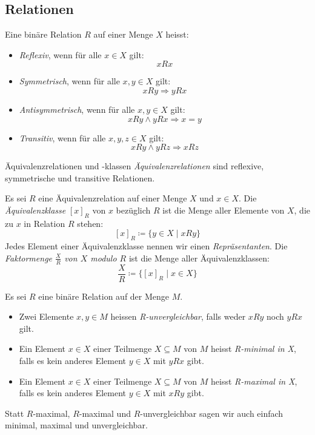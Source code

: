 \subsection{Relationen}\label{subsec:relationen}

\begin{definition}{}
    Eine binäre Relation $R$ auf einer Menge $X$ heisst:
    \begin{itemize}
        \item \emph{Reflexiv}, wenn für alle $x \in X$ gilt: \[xRx\]
        \item \emph{Symmetrisch}, wenn für alle $x,y \in X$ gilt: \[xRy \Rightarrow yRx\]
        \item \emph{Antisymmetrisch}, wenn für alle $x,y \in X$ gilt: \[xRy \land yRx \Rightarrow x = y\]
        \item \emph{Transitiv}, wenn für alle $x,y,z \in X$ gilt: \[xRy \land yRz \Rightarrow xRz\]
    \end{itemize}
\end{definition}

\begin{definition}{Äquivalenzrelationen und -klassen}
    \emph{Äquivalenzrelationen} sind reflexive, symmetrische und transitive Relationen.

    Es sei $R$ eine Äquivalenzrelation auf einer Menge $X$ und $x \in X$.
    Die \emph{Äquivalenzklasse} $[x]_R$ von $x$ bezüglich $R$ ist die Menge aller Elemente von $X$, die zu $x$ in Relation $R$ stehen: \[[x]_R \coloneqq \{y \in X \mid xRy\}\] Jedes Element einer Äquivalenzklasse nennen wir einen \emph{Repräsentanten}.
    Die \emph{Faktormenge $\frac{X}{R}$ von $X$ modulo $R$} ist die Menge aller Äquivalenzklassen: \[\frac{X}{R} \coloneqq \{[x]_R \mid x \in X \}\]
\end{definition}

\begin{definition}{}
    Es sei $R$ eine binäre Relation auf der Menge $M$.
    \begin{itemize}
        \item Zwei Elemente $x,y \in M$ heissen \emph{R-unvergleichbar}, falls weder $xRy$ noch $yRx$ gilt.
        \item Ein Element $x \in X$ einer Teilmenge $X \subseteq M$ von $M$ heisst \emph{R-minimal in X}, falls es kein anderes Element $y \in X$ mit $yRx$ gibt.
        \item Ein Element $x \in X$ einer Teilmenge $X \subseteq M$ von $M$ heisst \emph{R-maximal in X}, falls es kein anderes Element $y \in X$ mit $xRy$ gibt.
    \end{itemize}
    Statt $R$-maximal, $R$-maximal und $R$-unvergleichbar sagen wir auch einfach minimal, maximal und unvergleichbar.
\end{definition}

